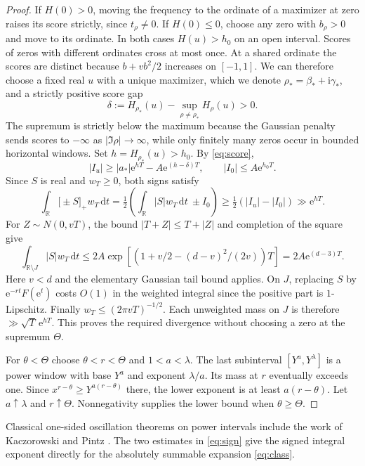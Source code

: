 \documentclass[11pt,a4paper]{article}
\newcommand{\ii}{\mathrm i}
\newcommand{\dd}{\,\mathrm d}
\newcommand{\ee}{\mathrm e}
\newcommand{\pos}[1]{\bigl[#1\bigr]_+}
\begin{document}
\begin{proof}
If $H(0)>0$, moving the frequency to the ordinate of a maximizer at zero raises its score strictly, since $t_\rho\ne0$. If $H(0)\le0$, choose any zero with $b_\rho>0$ and move to its ordinate. In both cases $H(u)>h_0$ on an open interval. Scores of zeros with different ordinates cross at most once. At a shared ordinate the scores are distinct because $b+vb^2/2$ increases on $[-1,1]$. We can therefore choose a fixed real $u$ with a unique maximizer, which we denote
$\rho_*=\beta_*+\ii\gamma_*$, and a strictly positive score gap
\[
\delta:=H_{\rho_*}(u)-\sup_{\rho\ne\rho_*}H_\rho(u)>0.
\]
The supremum is strictly below the maximum because the Gaussian penalty sends scores to $-\infty$ as $|\Im\rho|\to\infty$, while only finitely many zeros occur in bounded horizontal windows. Set $h=H_{\rho_*}(u)>h_0$. By \eqref{eq:score},
\[
 |I_u|\ge |a_*|\ee^{hT}-A\ee^{(h-\delta)T},
 \qquad |I_0|\le A\ee^{h_0T}.
\]
Since $S$ is real and $w_T\ge0$, both signs satisfy
\begin{equation}\label{eq:sign}
 \int_{\mathbb R}\pos{\pm S}w_T\dd t
  =\tfrac12\left(\int_{\mathbb R}|S|w_T\dd t\ \pm I_0\right)
    \ge\tfrac12(|I_u|-|I_0|)\gg\ee^{hT}.
\end{equation}
For $Z\sim N(0,vT)$, the bound $|T+Z|\le T+|Z|$ and completion of the square give
\[
 \int_{\mathbb R\setminus J}|S|w_T\dd t
 \le 2A\exp\!\left[\left(1+v/2-(d-v)^2/(2v)\right)T\right]
 =2A\ee^{(d-3)T}.
\]
Here $v<d$ and the elementary Gaussian tail bound applies. On $J$, replacing $S$ by $\ee^{-rt}F(\ee^t)$ costs $O(1)$ in the weighted integral since the positive part is $1$-Lipschitz. Finally $w_T\le(2\pi vT)^{-1/2}$. Each unweighted mass on $J$ is therefore $\gg\sqrt T\,\ee^{hT}$. This proves the required divergence without choosing a zero at the supremum $\Theta$.

For $\theta<\Theta$ choose $\theta<r<\Theta$ and $1<a<\lambda$. The last subinterval $[Y^a,Y^\lambda]$ is a power window with base $Y^a$ and exponent $\lambda/a$. Its mass at $r$ eventually exceeds one. Since $x^{r-\theta}\ge Y^{a(r-\theta)}$ there, the lower exponent is at least $a(r-\theta)$. Let $a\uparrow\lambda$ and $r\uparrow\Theta$. Nonnegativity supplies the lower bound when $\theta\ge\Theta$.
\end{proof}
Classical one-sided oscillation theorems on power intervals include the work of Kaczorowski and Pintz \cite{kp}. The two estimates in \eqref{eq:sign} give the signed integral exponent directly for the absolutely summable expansion \eqref{eq:class}.
\end{document}
